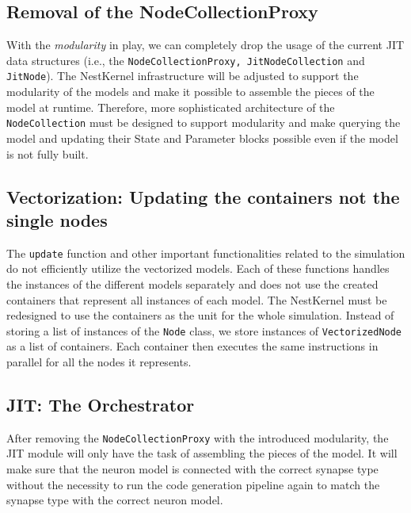 \subsection*{Removal of the NodeCollectionProxy}

With the \emph{modularity} in play, we can completely drop the usage of the current JIT data structures (i.e., the \texttt{NodeCollectionProxy, JitNodeCollection} and \texttt{JitNode}). The NestKernel infrastructure will be adjusted to support the modularity of the models and make it possible to assemble the pieces of the model at runtime. Therefore, more sophisticated architecture of the \texttt{NodeCollection} must be designed to support modularity and make querying the model and updating their State and Parameter blocks possible even if the model is not fully built.


\subsection*{Vectorization: Updating the containers not the single nodes}

The \texttt{update} function and other important functionalities related to the simulation do not efficiently utilize the vectorized models. Each of these functions handles the instances of the different models separately and does not use the created containers that represent all instances of each model. The NestKernel must be redesigned to use the containers as the unit for the whole simulation. Instead of storing a list of instances of the \texttt{Node} class, we store instances of \texttt{VectorizedNode} as a list of containers. Each container then executes the same instructions in parallel for all the nodes it represents.

\subsection*{JIT: The Orchestrator}

After removing the \texttt{NodeCollectionProxy} with the introduced modularity, the JIT module will only have the task of assembling the pieces of the model. It will make sure that the neuron model is connected with the correct synapse type without the necessity to run the code generation pipeline again to match the synapse type with the correct neuron model.

\cleardoublepage
